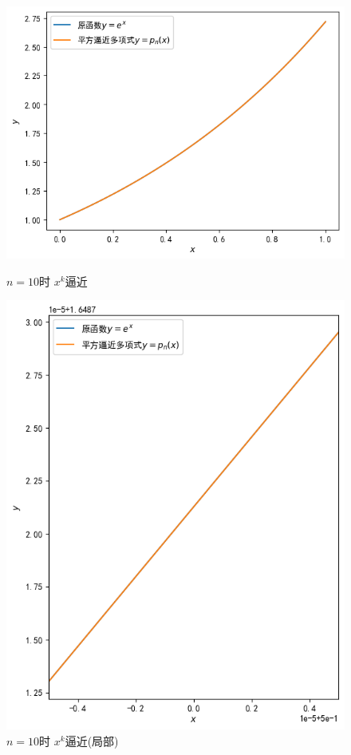 \documentclass[UTF8,ctexart,a4paper,11pt,openany]{article}
\theoremstyle{definition}
\begin{document}
    \begin{figure}[H]
        \centering
        \begin{minipage}{0.49\linewidth}%
            \centering
            \includegraphics[width=0.9\linewidth]{pics/P5.3.png}
            \caption{$n=10$时 $x^k$逼近}
        \end{minipage}
     \begin{minipage}{0.49\linewidth}
     \centering
     \includegraphics[width=0.9\linewidth]{pics/P5.6.png}
            \caption{$n=10$时 $x^k$逼近(局部)}
        \end{minipage}
    \end{figure}
\end{document}
